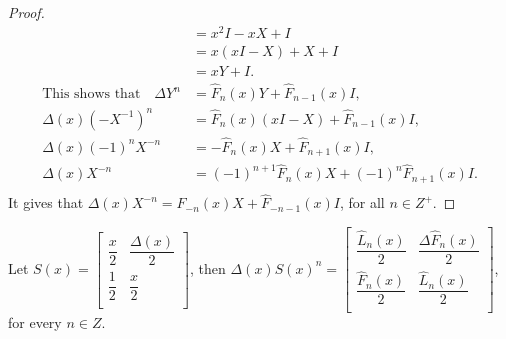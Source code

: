 \begin{proof}
\begin{align*}
									 &=x^2I-xX+I\\
									 &=x(xI-X)+X+I\\
									 &=xY+I.\\
\text{This shows that}\quad\Delta Y^n&=\widehat{F}_{n}(x)Y+\widehat{F}_{n-1}(x)I,\\
		\Delta(x)(-X^{-1})^n&=\widehat{F}_{n}(x)(xI-X)+\widehat{F}_{n-1}(x)I,\\
			 \Delta(x)(-1)^nX^{-n}&=-\widehat{F}_{n}(x)X+\widehat{F}_{n+1}(x)I,\\
						 \Delta(x) X^{-n}&=(-1)^{n+1}\widehat{F}_{n}(x)X+(-1)^n\widehat{F}_{n+1}(x)I.\\
\end{align*}	
It gives that $ \Delta(x) X^{-n}=\widehat{F}_{-n}(x)X+\widehat{F}_{-n-1}(x)I$, for all $n\in Z^+$.
\end{proof}
\begin{corollary}\label{b}
Let $S(x)={\left[
 \begin{array}{cc}
    \dfrac{x}{2} & \dfrac{\Delta(x)}{2} \\
    \dfrac{1}{2}& \dfrac{x}{2} \\
	\end{array}
	\right]}$, then  $\Delta(x) S(x)^n={\left[
 \begin{array}{cc}
    \dfrac{\widehat{L}_{n}(x)}{2} & \dfrac{\Delta\widehat{F}_{n}(x)}{2} \\
    \dfrac{\widehat{F}_{n}(x)}{2} & \dfrac{\widehat{L}_{n}(x)}{2} \\
	\end{array}
	\right]}$, for every $n\in Z$.	
\end{corollary}
